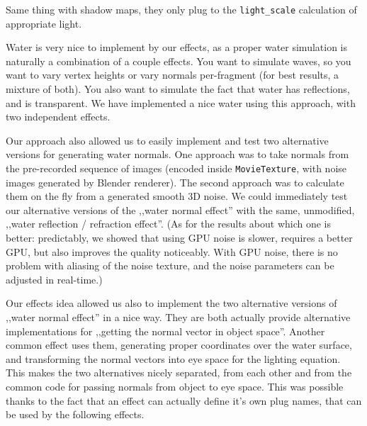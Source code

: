 \documentclass{acmsiggraph}                     %
\begin{document}
Same thing with shadow maps, they only plug to the \texttt{light\_scale}
calculation of appropriate light.

Water is very nice to implement by our effects, as a proper water simulation
is naturally a combination of a couple effects.
You want to simulate waves, so you want to vary vertex
heights or vary normals per-fragment (for best results, a mixture of both).
You also want to simulate the fact that water has reflections, and
is transparent. We have implemented a nice water using this approach,
with two independent effects.

Our approach also allowed us to easily implement and test
two alternative versions for generating water normals.
One approach was to take normals from the pre-recorded sequence of images
(encoded inside \texttt{MovieTexture},
with noise images generated by Blender renderer).
The second approach was to calculate them on the fly from
a generated smooth 3D noise. We could immediately test our alternative versions
of the ,,water normal effect'' with the same, unmodified,
,,water reflection / refraction effect''.
(As for the results about which one is better: predictably, we showed
that using GPU noise is slower, requires a better GPU,
but also improves the quality noticeably. With GPU noise, there is no problem
with aliasing of the noise texture, and the noise parameters can be adjusted
in real-time.)

Our effects idea allowed us also to implement the two alternative versions
of ,,water normal effect'' in a nice way. They are both actually provide
alternative implementations for ,,getting the normal vector in object space''.
Another common effect uses them, generating proper coordinates over
the water surface, and transforming the normal vectors into eye space for
the lighting equation. This makes the two alternatives nicely separated,
from each other and from the common code for passing normals from object to eye space.
This was possible thanks to the fact that an effect can actually define
it's own plug names, that can be used by the following effects.
\end{document}
